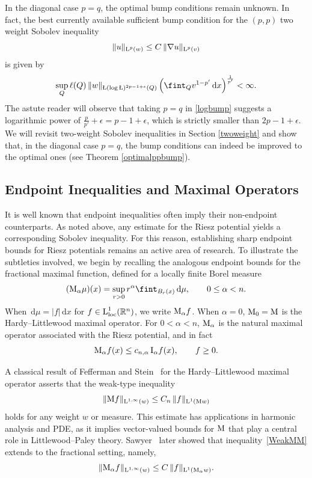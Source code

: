 \documentclass[11pt, a4paper, reqno]{amsart}
\newcommand{\R}{\mathbb R}
\newcommand{\ep}{\epsilon}
\newcommand{\al}{\alpha}
\newcommand{\dx}{\,{\mathrm dx}}
\newcommand{\dmu}{\,{\mathrm d\mu}}
\newcommand{\Lup}{\textup{L}}
\newcommand{\Ldash}{\textup{\L}}
\theoremstyle{definition}
\theoremstyle{remark}
\begin{document}
In the diagonal case $p=q$, the optimal bump conditions remain unknown. In fact, the best currently available sufficient bump condition for the $(p,p)$ two weight Sobolev inequality
\begin{equation*}\label{pptwowSob}
\|u\|_{\Lup^p(w)} \le C\,\|\nabla u\|_{\Lup^p(v)}
\end{equation*}
is given by
\begin{equation}\label{nonoptlogbump}
\sup_Q \ell(Q)\,
\|w\|_{\Ldash(\log \Ldash)^{2p-1+\ep}(Q)}
\left(\fint_Q v^{1-p'}\,\mathrm dx\right)^{\frac1{p'}}
<\infty.
\end{equation}
The astute reader will observe that taking $p=q$ in \eqref{logbump} suggests a logarithmic power of $\frac{p}{p'}+\ep = p-1+\ep$, which is strictly smaller than $2p-1+\ep$. We will revisit two-weight Sobolev inequalities in Section \ref{twoweight} and show that, in the diagonal case $p=q$, the bump conditions can indeed be improved to the optimal ones (see Theorem \ref{optimalppbump}).


\subsection{Endpoint Inequalities and Maximal Operators}

It is well known that endpoint inequalities often imply their non-endpoint counterparts. As noted above, any estimate for the Riesz potential yields a corresponding Sobolev inequality. 
{For this reason, establishing sharp endpoint bounds for Riesz potentials remains} an active area of research. To illustrate the subtleties involved, we begin by recalling the analogous endpoint bounds for the fractional maximal function, defined for a locally finite Borel measure
\[
(\textup{M}_\alpha \mu)(x)
= \sup_{r>0} r^\alpha \fint_{B_r(x)}  \dmu,
\qquad 0 \le \alpha < n.
\]
When $\dmu=|f|\dx$ for $f\in\Lup_{\text{loc}}^1(\R^n)$, we write $\textup{M}_\al f$.  When $\alpha=0$, $\textup{M}_0=\textup{M}$ is the Hardy--Littlewood maximal operator. For $0<\alpha<n$, $\textup{M}_\alpha$ is the natural maximal operator associated with the Riesz potential, and in fact
\[
\textup{M}_\alpha f(x)\le c_{n,\alpha}\,\textup{I}_\alpha f(x),
\qquad f\ge 0.
\]

A classical result of {Fefferman and Stein}~\cite{St} for the Hardy--Littlewood maximal operator asserts that the weak-type inequality
\begin{equation}\label{WeakMM}
\|\textup{M}f\|_{\Lup^{1,\infty}(w)}
\le { C_n}\,\|f\|_{\Lup^1(\textup{M}w)}
\end{equation}
holds for any weight $w$ {or measure}. This estimate has applications in harmonic analysis and PDE, as it implies vector-valued bounds for $\textup{M}$ that play a central role in Littlewood--Paley theory. Sawyer~\cite{Saw81} later showed that inequality~\eqref{WeakMM} extends to the fractional setting, namely,
\begin{equation} \label{Malweak}
\|\textup{M}_\alpha f\|_{\Lup^{1,\infty}(w)}
\le C\,\|f\|_{\Lup^1(\textup{M}_\alpha w)}.
\end{equation}
\end{document}

